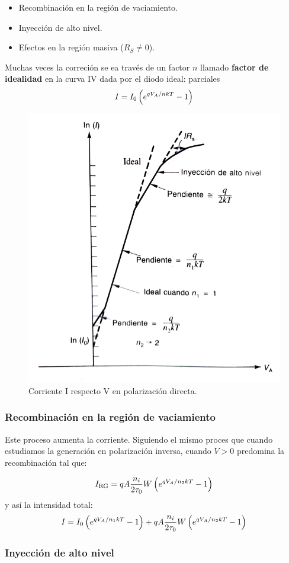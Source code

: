 \begin{itemize}
    \item Recombinación en la región de vaciamiento.
    \item Inyección de alto nivel.
    \item Efectos en la región masiva ($R_S\neq 0$).
\end{itemize}
Muchas veces la correción se ea través de un factor $n$ llamado \textbf{factor de idealidad} en la curva IV dada por el diodo ideal: 
parciales
\begin{equation}
    I = I_0 \left( e^{qV_A/nkT}-1 \right)
\end{equation}
\begin{figure}[h!] \centering
    \includegraphics[width=0.5\linewidth]{Cuerpo/Ch_03/03_Temario_11.png}
    \caption{Corriente I respecto V en polarización directa.}
\end{figure}


\subsubsection{Recombinación en la región de vaciamiento}

Este proceso aumenta la corriente. Siguiendo el mismo proces que cuando estudiamos la generación en polarización inversa, cuando $V>0$ predomina la recombinación tal que: 

\begin{equation}
    I_{\text{RG}} = q A \frac{n_i}{2\tau_0} W \left( e^{qV_A/n_2kT}-1 \right)
\end{equation}
y así la intensidad total: 
\begin{equation}
    I = I_0 \left( e^{qV_A/n_1kT}-1 \right) +q A \frac{n_i}{2\tau_0} W \left( e^{qV_A/n_2kT}-1 \right)
\end{equation}

\subsubsection{Inyección de alto nivel}

